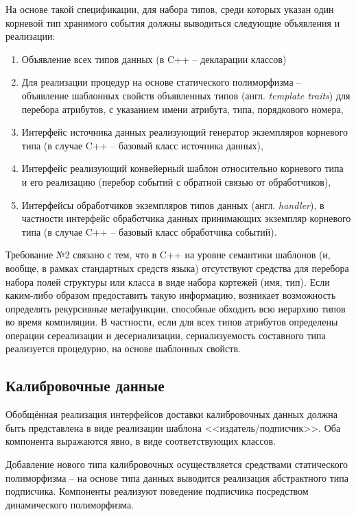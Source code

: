 На основе такой спецификации, для набора типов,
среди которых указан один корневой тип хранимого события должны
выводиться следующие объявления и реализации:
\begin{enumerate}
    \item Объявление всех типов данных (в C++ -- декларации классов)
    \item Для реализации процедур на основе статического
    полиморфизма -- объявление
    шаблонных свойств объявленных типов (англ. \emph{template traits}) для
    перебора атрибутов, с указанием имени атрибута, типа, порядкового
    номера,
    \item Интерфейс источника данных реализующий генератор
    экземпляров корневого типа (в случае C++ -- базовый класс
    источника данных),
    \item Интерфейс реализующий конвейерный шаблон
    относительно корневого типа и его реализацию (перебор событий
    с обратной связью от обработчиков),
    \item Интерфейсы обработчиков экземпляров типов данных (англ. \emph{handler}),
    в частности интерфейс обработчика данных принимающих экземпляр
    корневого типа (в случае C++ -- базовый класс обработчика
    событий).
\end{enumerate}

Требование №2 связано с тем, что в C++ на уровне семантики шаблонов
(и, вообще, в рамках стандартных средств языка)
отсутствуют средства для перебора набора полей структуры или класса
в виде набора кортежей (имя, тип). Если каким-либо образом предоставить
такую информацию, возникает возможность определять рекурсивные
метафункции, способные обходить всю иерархию типов во время компиляции.
В частности, если для всех типов атрибутов определены
операции сереализации и десериализации, сериализуемость составного
типа реализуется процедурно, на основе шаблонных свойств.

\subsection{Калибровочные данные}

Обобщённая реализация интерфейсов доставки калибровочных данных
должна быть представлена в виде реализации шаблона <<издатель/подписчик>>.
Оба компонента выражаются явно, в виде соответствующих классов.

Добавление нового типа калибровочных осуществляется средствами статического
полиморфизма -- на основе типа данных выводится реализация абстрактного
типа подписчика. Компоненты реализуют поведение подписчика посредством
динамического полиморфизма.

